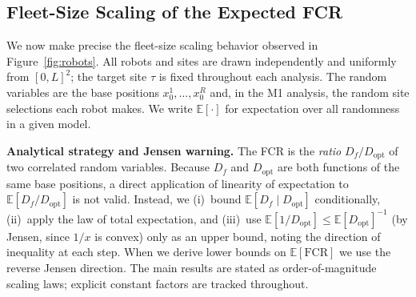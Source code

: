 %
%

\subsection{Fleet-Size Scaling of the Expected FCR}\label{sec:scaling}

We now make precise the fleet-size scaling behavior observed in
Figure~\ref{fig:robots}.
All robots and sites are drawn independently and uniformly from $[0,L]^2$;
the target site $\tau$ is fixed throughout each analysis.
The random variables are the base positions $x_0^1,\ldots,x_0^R$ and,
in the M1 analysis, the random site selections each robot makes.
We write $\mathbb{E}[\cdot]$ for expectation over all randomness in a
given model.

\medskip
\noindent
\textbf{Analytical strategy and Jensen warning.}
The FCR is the \emph{ratio} $D_f / D_{\mathrm{opt}}$ of two correlated
random variables.
Because $D_f$ and $D_{\mathrm{opt}}$ are both functions of the same base
positions, a direct application of linearity of expectation to
$\mathbb{E}[D_f/D_{\mathrm{opt}}]$ is not valid.
Instead, we (i)~bound $\mathbb{E}[D_f \mid D_{\mathrm{opt}}]$ conditionally,
(ii)~apply the law of total expectation, and (iii)~use
$\mathbb{E}[1/D_{\mathrm{opt}}] \leq \mathbb{E}[D_{\mathrm{opt}}]^{-1}$
(by Jensen, since $1/x$ is convex) only as an upper bound, noting the
direction of inequality at each step.
When we derive lower bounds on $\mathbb{E}[\mathrm{FCR}]$ we use the
reverse Jensen direction.
The main results are stated as order-of-magnitude scaling laws; explicit
constant factors are tracked throughout.


